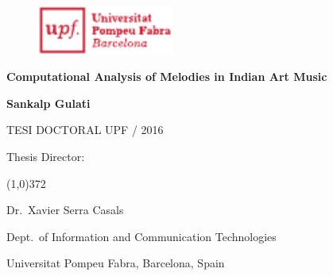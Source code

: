 
\newpage
\thispagestyle{empty}
\begin{titlingpage}
\begin{flushright}

  \begin{figure}[t]
    \begin{flushright}
      \includegraphics[width=4.5cm]{ch00/figures/upf-logo-bo}
    \end{flushright}
  \end{figure}

  \vspace*{2.2cm} 

  {\huge \textbf{Computational Analysis of Melodies in Indian Art Music}}
  
  \vspace*{2cm}

  {\Large \textbf{Sankalp Gulati}}
  
  \vspace*{\fill} 
  TESI DOCTORAL UPF / 2016

\end{flushright}
  
  \vspace*{1.5cm}

  Thesis Director:

  \vspace*{-0.25cm}

  \line(1,0){372}
  
  \vspace*{0.25cm}

  Dr.~Xavier Serra Casals

  Dept.~of Information and Communication Technologies

  Universitat Pompeu Fabra, Barcelona, Spain
  
\end{titlingpage}


